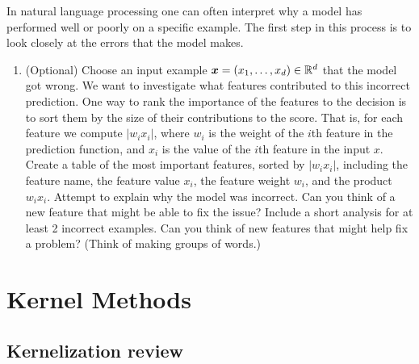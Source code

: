 \documentclass{article}
\theoremstyle{plain}
\theoremstyle{definition}
\begin{document}
In natural language processing 
one can often interpret why a model has performed well or poorly on
a specific example. The
first step in this process is to look closely at the errors that the
model makes.

\begin{enumerate}
  \setcounter{enumi}{\value{saveenum}}
\item \textcolor{nyupurple}{(Optional)} Choose an input example $\boldsymbol{x}=\left(x_{1},\ldots,x_{d}\right)\in\mathbb{R}^{d}$
that the model got wrong. We want to investigate what features contributed
to this incorrect prediction. One way to rank the importance of the
features to the decision is to sort them by the size of their contributions
to the score. That is, for each feature we compute $\left|w_{i}x_{i}\right|$,
where $w_{i}$ is the weight of the $i$th feature in the prediction
function, and $x_{i}$ is the value of the $i$th feature in the input
$x$. Create a table of the most important features, sorted by $\left|w_{i}x_{i}\right|$,
including the feature name, the feature value $x_{i}$, the feature
weight $w_{i}$, and the product $w_{i}x_{i}$. Attempt to explain
why the model was incorrect. Can you think of a new feature that might
be able to fix the issue? Include a short analysis for at least 2
incorrect examples.
Can you think of new features that might help fix a problem? (Think of making groups of words.)
\setcounter{saveenum}{\value{enumi}}
\end{enumerate}


\section{\large Kernel Methods}

\subsection{Kernelization review}
\end{document}

